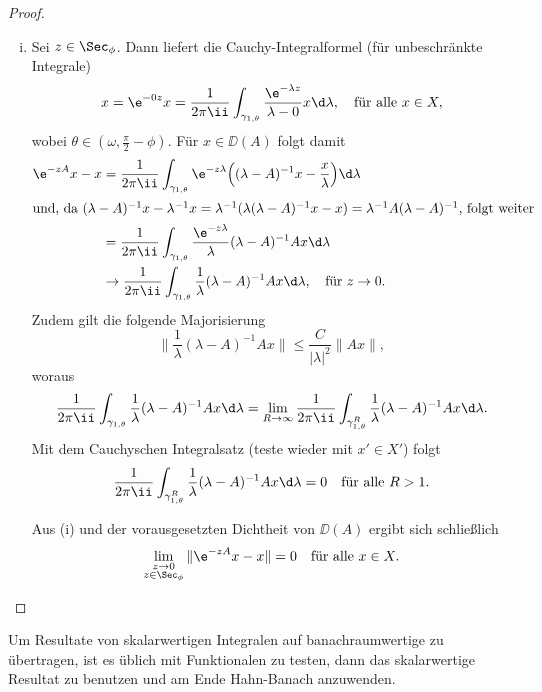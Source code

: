 \begin{proof}
\begin{enumerate}[(i)]
    \item Sei $z \in \Sec_\phi$. 
      Dann liefert die Cauchy-Integralformel (für unbeschränkte Integrale)
      $$
      x 
      = \e^{-0z} x
      = \frac{1}{2\pi \ii} \int_{\gamma_{1,\theta}} \frac{\e^{-\lambda z}}{\lambda - 0} x \d \lambda, \quad\text{für alle } x \in X,
      $$
      wobei $\theta \in (\omega, \frac{\pi}{2} - \phi)$.
      Für $x \in \DD(A)$ folgt damit
     \begin{align*}
       \e^{-zA} x - x 
       &= \frac{1}{2\pi \ii} \int_{\gamma_{1,\theta}} \e^{-z\lambda} \Big( (\lambda - A)^{-1} x - \frac{x}{\lambda} \Big) \d \lambda\\
       \intertext{und, da $(\lambda - A)^{-1} x - \lambda^{-1} x = \lambda^{-1}(\lambda(\lambda - A)^{-1}x - x) = \lambda^{-1} A (\lambda - A)^{-1}$, folgt weiter}
       &= \frac{1}{2\pi \ii} \int_{\gamma_{1,\theta}} \frac{\e^{-z\lambda}}{\lambda}  (\lambda - A)^{-1} A x \d \lambda \\
       &\to \frac{1}{2\pi \ii} \int_{\gamma_{1,\theta}} \frac{1}{\lambda} (\lambda - A)^{-1} A x \d \lambda, \quad \text{für } z \to 0.
     \end{align*}
     Zudem gilt die folgende Majorisierung
     $$
     \| \frac{1}{\lambda} (\lambda - A)^{-1} A x \| \leq \frac{C}{|\lambda|^2} \|A x \|,
     $$
     woraus 
     $$
     \frac{1}{2\pi \ii} \int_{\gamma_{1,\theta}} \frac{1}{\lambda} (\lambda - A)^{-1} A x \d \lambda = \lim_{R \to \infty} \frac{1}{2\pi \ii} \int_{\gamma_{1,\theta}^R} \frac{1}{\lambda} (\lambda - A)^{-1} A x \d \lambda.
     $$
     Mit dem Cauchyschen Integralsatz (teste wieder mit $x' \in X'$) folgt
     $$
     \frac{1}{2\pi \ii} \int_{\gamma_{1,\theta}^R} \frac{1}{\lambda} (\lambda - A)^{-1} A x \d\lambda = 0 \quad\text{für alle }R > 1.
     $$

     Aus (i) und der vorausgesetzten Dichtheit von $\DD(A)$ ergibt sich schließlich
     \[
     \lim_{\substack{z \to 0\\ z \in \Sec_\phi}} \|\e^{-zA} x - x \| = 0 \quad\text{für alle } x \in X. \qedhere
     \]
  \end{enumerate}
\end{proof}

\begin{rem}
  Um Resultate von skalarwertigen Integralen auf banachraumwertige zu übertragen, ist es üblich mit Funktionalen zu testen, dann das skalarwertige Resultat zu benutzen und am Ende Hahn-Banach anzuwenden.
\end{rem}

